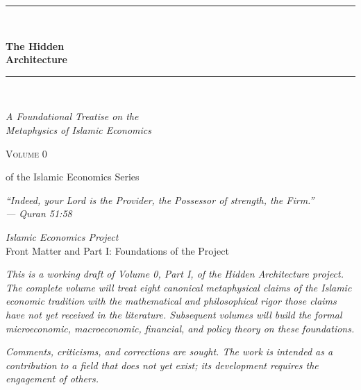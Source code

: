\documentclass[11pt,a4paper,openany]{book}
\theoremstyle{cleanrm}
\newcommand{\Quran}[1]{Quran #1}
\begin{document}

\frontmatter

\begin{titlepage}
\centering
\vspace*{1.5cm}
{\color{themegreen}\rule{0.6\textwidth}{1pt}}\\[1em]
{\Huge\bfseries\color{themegreen} The Hidden\\[0.2em] Architecture\par}
\vspace{0.8em}
{\color{themegold}\rule{0.4\textwidth}{0.5pt}}\\[1em]
{\Large\itshape A Foundational Treatise on the\\
Metaphysics of Islamic Economics\par}
\vspace{1cm}
{\large \textsc{Volume 0}\par}
\vspace{0.5em}
{\large of the Islamic Economics Series\par}
\vspace{4cm}

{\itshape\large
``Indeed, your Lord is the Provider, the Possessor of strength, the Firm.''\\[0.3em]
--- \Quran{51:58}\par}

\vfill
{\large \textit{Islamic Economics Project}}\\[0.3em]
{\small Front Matter and Part I: Foundations of the Project}
\end{titlepage}

\thispagestyle{empty}
\vspace*{4in}
\noindent\textit{This is a working draft of Volume 0, Part I, of the
Hidden Architecture project. The complete volume will treat eight
canonical metaphysical claims of the Islamic economic tradition with the
mathematical and philosophical rigor those claims have not yet
received in the literature. Subsequent volumes will build the formal
microeconomic, macroeconomic, financial, and policy theory on these
foundations.}
\vspace{0.5in}

\noindent\textit{Comments, criticisms, and corrections are sought.
The work is intended as a contribution to a field that does not yet
exist; its development requires the engagement of others.}
\cleardoublepage
\end{document}
